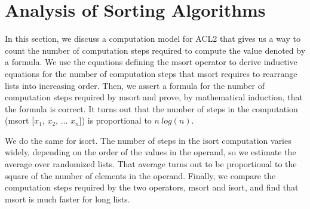 \begin{exercises}




\end{exercises}

\section{Analysis of Sorting Algorithms}
\label{sec:sort-analysis}

In
this section, we discuss a
computation model for ACL2
that gives us a way to count the number of computation steps required
to compute the value denoted by a formula.
We use the equations defining
the \textsf{msort} operator to derive inductive equations
for the number of computation steps that \textsf{msort} requires to rearrange lists
into increasing order.
Then, we assert a formula for the number of computation steps required
by \textsf{msort} and prove, by mathematical induction,
that the formula is correct.
It turns out that the number of steps in the computation
\textsf{(msort [$x_1$, $x_2$, $\dots$ $x_n$])}
is proportional to $n~log(n)$.

We do the same for \textsf{isort}.
The number of steps in the \textsf{isort} computation varies widely,
depending on the order of the values in the operand,
so we estimate the average over randomized lists.
That average turns out to be proportional
to the square of the number of elements in the operand.
Finally, we compare the computation steps required by
the two operators, \textsf{msort} and \textsf{isort}, and find that
\textsf{msort} is much faster for long lists.

